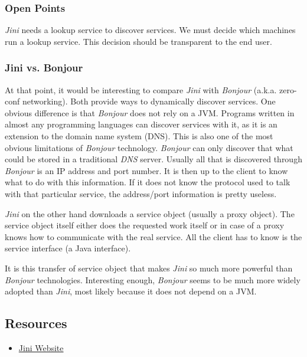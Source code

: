 \subsubsection{Open Points}
\emph{Jini} needs a lookup service to discover services. We must decide which machines run a lookup service. This decision should be transparent to the end user.

\subsubsection{Jini vs. Bonjour}
At that point, it would be interesting to compare \emph{Jini} with \emph{Bonjour} (a.k.a. zero-conf networking). Both provide ways to dynamically discover services. One obvious difference is that \emph{Bonjour} does not rely on a JVM. Programs written in almost any programming languages can discover services with it, as it is an extension to the domain name system (DNS). This is also one of the most obvious limitations of \emph{Bonjour} technology. \emph{Bonjour} can only discover that what could be stored in a traditional \emph{DNS} server. Usually all that is discovered through \emph{Bonjour} is an IP address and port number. It is then up to the client to know what to do with this information. If it does not know the protocol used to talk with that particular service, the address/port information is pretty useless.

\emph{Jini} on the other hand downloads a service object (usually a proxy object). The service object itself either does the requested work itself or in case of a proxy knows how to communicate with the real service. All the client has to know is the service interface (a Java interface).

It is this transfer of service object that makes \emph{Jini} so much more powerful than \emph{Bonjour} technologies. Interesting enough, \emph{Bonjour} seems to be much more widely adopted than \emph{Jini}, most likely because it does not depend on a JVM.


\subsection{Resources}
\begin{itemize}
 \item \href{http://www.jini.org/}{Jini Website}
\end{itemize}
